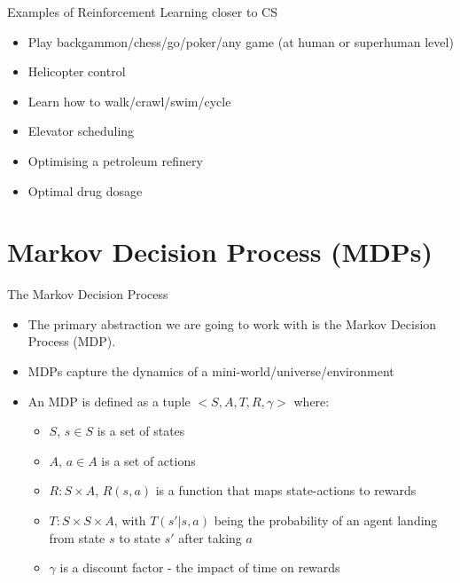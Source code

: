 \documentclass[]{beamer}
\providecommand{\tightlist}{%
  \setlength{\itemsep}{0pt}\setlength{\parskip}{0pt}}
\begin{document}
\begin{frame}{Examples of Reinforcement Learning closer to CS}

\begin{itemize}
\tightlist
\item
  Play backgammon/chess/go/poker/any game (at human or superhuman level)
\item
  Helicopter control
\item
  Learn how to walk/crawl/swim/cycle
\item
  Elevator scheduling
\item
  Optimising a petroleum refinery
\item
  Optimal drug dosage
\end{itemize}

\end{frame}

\section{Markov Decision Process
(MDPs)}\label{markov-decision-process-mdps}

\begin{frame}{The Markov Decision Process}

\begin{itemize}
\tightlist
\item
  The primary abstraction we are going to work with is the Markov
  Decision Process (MDP).
\item
  MDPs capture the dynamics of a mini-world/universe/environment
\item
  An MDP is defined as a tuple \(<S,A,T,R,\gamma>\) where:

  \begin{itemize}
  \tightlist
  \item
    \(S\), \(s \in S\) is a set of states
  \item
    \(A\), \(a \in A\) is a set of actions
  \item
    \(R:S \times A\), \(R(s,a)\) is a function that maps state-actions
    to rewards
  \item
    \(T:S\times S\times A\), with \(T(s'| s, a)\) being the probability
    of an agent landing from state \(s\) to state \(s'\) after taking
    \(a\)
  \item
    \(\gamma\) is a discount factor - the impact of time on rewards
  \end{itemize}
\end{itemize}

\end{frame}
\end{document}
